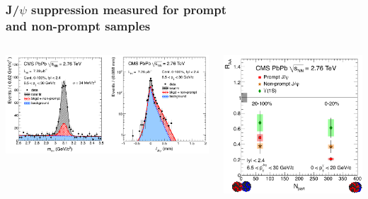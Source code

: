\documentclass[compress]{beamer}
\begin{document}
\begin{frame}
\frametitle{J/$\psi$ suppression measured for prompt \\ and non-prompt samples}

\begin{columns}
\includegraphics[width=\linewidth]{dimuons/jpsi_prompt_nonprompt.png}

\includegraphics[width=\linewidth]{dimuons/jpsi_prompt_nonprompt_centrality.png}
\end{columns}


\end{frame}
\end{document}
